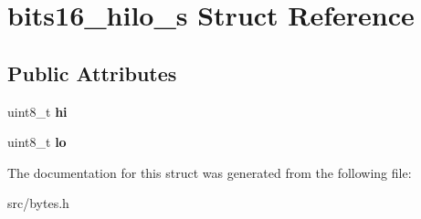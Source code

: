 \hypertarget{structbits16__hilo__s}{}\section{bits16\+\_\+hilo\+\_\+s Struct Reference}
\label{structbits16__hilo__s}
\subsection*{Public Attributes}
\begin{DoxyCompactItemize}
\item 
uint8\+\_\+t {\bfseries hi}\hypertarget{structbits16__hilo__s_a98071eaa0aa7ced793222f30fa7955e4}{}\label{structbits16__hilo__s_a98071eaa0aa7ced793222f30fa7955e4}

\item 
uint8\+\_\+t {\bfseries lo}\hypertarget{structbits16__hilo__s_ab3f69ba4a390e1db439cf56708ecc799}{}\label{structbits16__hilo__s_ab3f69ba4a390e1db439cf56708ecc799}

\end{DoxyCompactItemize}


The documentation for this struct was generated from the following file\+:\begin{DoxyCompactItemize}
\item 
src/bytes.\+h\end{DoxyCompactItemize}
